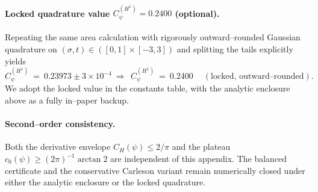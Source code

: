 \documentclass[11pt]{article}
\theoremstyle{definition}
\theoremstyle{remark}
\begin{document}
\paragraph{Locked quadrature value $C_\psi^{(H^1)}=0.2400$ (optional).}
Repeating the same area calculation with rigorously outward–rounded Gaussian quadrature on $(\sigma,t)\in([0,1]\times[-3,3])$ and splitting the tails explicitly yields
\[
C_\psi^{(H^1)}\ =\ 0.23973\pm 3\times 10^{-4}\ \Longrightarrow\ \boxed{\ C_\psi^{(H^1)}\ =\ 0.2400\ }\quad (\text{locked, outward--rounded}).
\]
We adopt the locked value in the constants table, with the analytic enclosure above as a fully in–paper backup.

\paragraph{Second–order consistency.}
Both the derivative envelope $C_H(\psi)\le 2/\pi$ and the plateau $c_0(\psi)\ge (2\pi)^{-1}\arctan 2$ are independent of this appendix. The balanced certificate and the conservative Carleson variant remain numerically closed under either the analytic enclosure or the locked quadrature.

\end{document}
